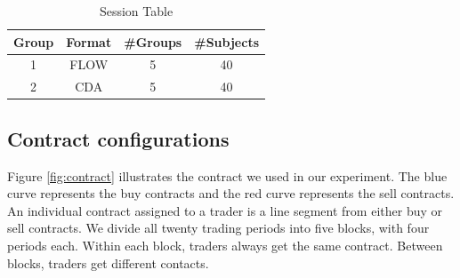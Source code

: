 \begin{table}[htbp!]
    \centering
    \caption{Session Table}
    \begin{tabular}{cccc} \hline \hline
      Group & Format & \#Groups & \#Subjects \\ \hline
      1 & FLOW & 5 & 40 \\
      2 & CDA & 5 & 40 \\
      \hline \hline
    \end{tabular}
    \label{tab:design}
\end{table}


\subsection{Contract configurations}
Figure \ref{fig:contract} illustrates the contract we used in our experiment. The blue curve represents the buy contracts and the red curve represents the sell contracts. An individual contract assigned to a trader is a line segment from either buy or sell contracts. We divide all twenty trading periods into five blocks, with four periods each. Within each block, traders always get the same contract. Between blocks, traders get different contacts. 


